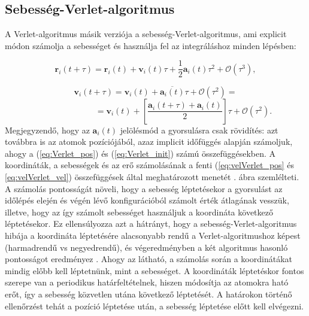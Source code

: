 \documentclass[12pt]{article}
\theoremstyle{plain}
\begin{document}
\subsection{Sebesség-Verlet-algoritmus}

A Verlet-algoritmus másik verziója a sebesség-Verlet-algoritmus, ami explicit módon számolja a sebességet és használja fel az integráláshoz minden lépésben:

\begin{equation}
	\mathbf{r}_i (t+\tau) = \mathbf{r}_i(t) + \mathbf{v}_i(t) \tau + \frac{1}{2} \mathbf{a}_i(t) \tau^2 + \mathcal{O}(\tau^3),
	\label{eq:velVerlet_pos}
\end{equation}

\begin{equation}
	\mathbf{v}_i (t+\tau) = \mathbf{v}_i(t) + \overline{\mathbf{a}_i(t)} \tau + \mathcal{O}(\tau^2) =
	\label{eq:velVerlet_vel}
\end{equation}
\begin{equation*}
	~~~~~~~~~~~~~~~~~~~~~~~~~~~~~~ =\mathbf{v}_i(t) + \left[\frac{ \mathbf{a}_i(t+\tau) + \mathbf{a}_i(t)}{2}\right] \tau + \mathcal{O}(\tau^2).
\end{equation*}
Megjegyzendő, hogy az $\mathbf{a}_i(t)$ jelölésmód a gyorsulásra csak rövidítés: azt továbbra is az atomok pozíciójából, azaz implicit időfüggés alapján számoljuk, ahogy a (\ref{eq:Verlet_pos}) és (\ref{eq:Verlet_init}) számú összefüggésekben. A koordináták, a sebességek és az erő számolásának a fenti (\ref{eq:velVerlet_pos} és \ref{eq:velVerlet_vel}) összefüggések által meghatározott menetét . ábra szemlélteti. A számolás pontosságát növeli, hogy a sebesség léptetésekor a gyorsulást az időlépés elején és végén lévő konfigurációból számolt érték átlagának vesszük, illetve, hogy az így számolt sebességet használjuk a koordináta következő léptetésekor. Ez ellensúlyozza azt a hátrányt, hogy a sebesség-Verlet-algoritmus hibája a koordináta léptetésére alacsonyabb rendű a Verlet-algoritmushoz képest (harmadrendű vs negyedrendű), és végeredményben a két algoritmus hasonló pontosságot eredményez \cite{Landau2012}. Ahogy az látható, a számolás során a koordinátákat mindig előbb kell léptetnünk, mint a sebességet. A koordináták léptetéskor fontos szerepe van a periodikus határfeltételnek, hiszen módosítja az atomokra ható erőt, így a sebesség közvetlen utána következő léptetését. A határokon történő ellenőrzést tehát a pozíció léptetése után, a sebesség léptetése előtt kell elvégezni.
\end{document}
